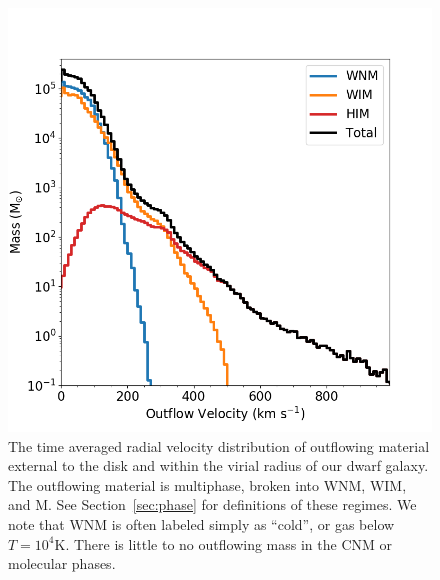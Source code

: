 \documentclass[twocolumn]{aastex61}
\begin{document}
\begin{figure}
\centering
\includegraphics[width=0.95\linewidth]{outflow_velocity_distribution}
\caption{The time averaged radial velocity distribution of outflowing material external to the disk and within the virial radius of our dwarf galaxy. The outflowing material is multiphase, broken into WNM, WIM, and M. See Section~\ref{sec:phase} for definitions of these regimes. We note that WNM is often labeled simply as ``cold'', or gas below $T = 10^{4}$K. There is little to no outflowing mass in the CNM or molecular phases.}
\label{fig:outflow_velocity}
\end{figure}
\end{document}
